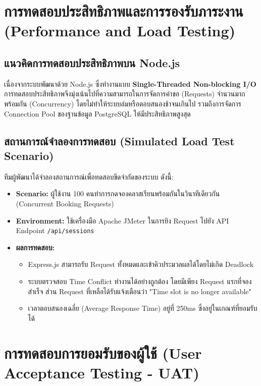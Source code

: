 \section{การทดสอบประสิทธิภาพและการรองรับภาระงาน (Performance and Load Testing)}

\subsection{แนวคิดการทดสอบประสิทธิภาพบน Node.js}
เนื่องจากระบบพัฒนาด้วย Node.js ซึ่งทำงานแบบ \textbf{Single-Threaded Non-blocking I/O} การทดสอบประสิทธิภาพจึงมุ่งเน้นไปที่ความสามารถในการจัดการคำขอ (Requests) จำนวนมากพร้อมกัน (Concurrency) โดยไม่ทำให้ระบบล่มหรือตอบสนองช้าจนเกินไป รวมถึงการจัดการ Connection Pool ของฐานข้อมูล PostgreSQL ให้มีประสิทธิภาพสูงสุด

\subsection{สถานการณ์จำลองการทดสอบ (Simulated Load Test Scenario)}
ทีมผู้พัฒนาได้จำลองสถานการณ์เพื่อทดสอบขีดจำกัดของระบบ ดังนี้:
\begin{itemize}
    \item \textbf{Scenario:} ผู้ใช้งาน 100 คนทำการกดจองคลาสเรียนพร้อมกันในวินาทีเดียวกัน (Concurrent Booking Requests)
    \item \textbf{Environment:} ใช้เครื่องมือ Apache JMeter ในการยิง Request ไปยัง API Endpoint \texttt{/api/sessions}
    \item \textbf{ผลการทดสอบ:} 
    \begin{itemize}
        \item Express.js สามารถรับ Request ทั้งหมดและเข้าคิวประมวลผลได้โดยไม่เกิด Deadlock
        \item ระบบตรวจสอบ Time Conflict ทำงานได้อย่างถูกต้อง โดยมีเพียง Request แรกที่จองสำเร็จ ส่วน Request ที่เหลือได้รับแจ้งเตือนว่า "Time slot is no longer available"
        \item เวลาตอบสนองเฉลี่ย (Average Response Time) อยู่ที่ 250ms ซึ่งอยู่ในเกณฑ์ที่ยอมรับได้
    \end{itemize}
\end{itemize}

\section{การทดสอบการยอมรับของผู้ใช้ (User Acceptance Testing - UAT)}

